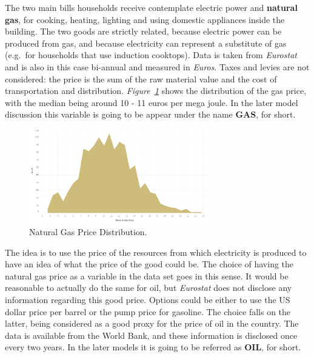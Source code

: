 \documentclass[a4paper,12pt]{book}
\begin{document}
The two main bills households receive contemplate electric power and \textbf{natural gas}, for cooking, heating, lighting and using domestic appliances inside the building. The two goods are strictly related, because electric power can be produced from gas, and because electricity can represent a substitute of gas (e.g.\ for households that use induction cooktops). Data is taken from \textit{Eurostat} and is also in this case bi-annual and measured in \textit{Euros}. Taxes and levies are not considered: the price is the sum of the raw material value and the cost of transportation and distribution. \textit{Figure~\ref{fig:ngpd}} shows the distribution of the gas price, with the median being around 10 - 11 euros per mega joule. In the later model discussion this variable is going to be appear under the name \textbf{GAS}, for short.

\begin{figure}[tb]
\begin{center}
\captionsetup{justification=centering}
\includegraphics[width=0.7\textwidth]{Images/nGas.png}
\caption{Natural Gas Price Distribution.}
\label{fig:ngpd}
\end{center}
\end{figure}

The idea is to use the price of the resources from which electricity is produced to have an idea of what the price of the good could be. The choice of having the natural gas price as a variable in the data set goes in this sense. It would be reasonable to actually do the same for oil, but \textit{Eurostat} does not disclose any information regarding this good price. Options could be either to use the US dollar price per barrel or the pump price for gasoline. The choice falls on the latter, being considered as a good proxy for the price of oil in the country. The data is available from the World Bank, and these information is disclosed once every two years. In the later models it is going to be referred as \textbf{OIL}, for short.
\end{document}
